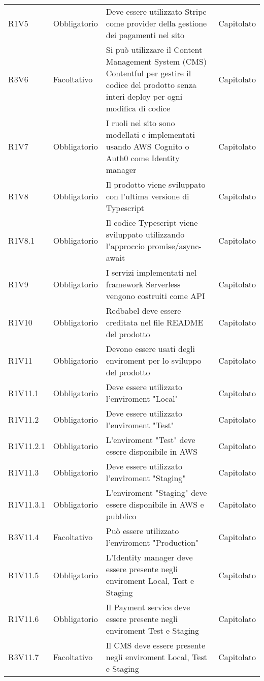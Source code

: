 {\begin{longtable}{C{2.5cm} C{2.8cm} C{6.7cm} C{2.5cm}}
R1V5 & Obbligatorio & Deve essere utilizzato Stripe come provider della gestione dei pagamenti nel sito & Capitolato \\

R3V6 & Facoltativo & Si può utilizzare il Content Management System (CMS) Contentful per gestire il codice del prodotto senza interi deploy per ogni modifica di codice & Capitolato \\

R1V7 & Obbligatorio & I ruoli nel sito sono modellati e implementati usando AWS Cognito o Auth0 come Identity manager & Capitolato \\

R1V8 & Obbligatorio & Il prodotto viene sviluppato con l'ultima versione di Typescript & Capitolato \\
R1V8.1 & Obbligatorio & Il codice Typescript viene sviluppato utilizzando l'approccio promise/async-await & Capitolato \\

R1V9 & Obbligatorio & I servizi implementati nel framework Serverless vengono costruiti come API & Capitolato \\

R1V10 & Obbligatorio & Redbabel deve essere creditata nel file README del prodotto & Capitolato \\

R1V11 & Obbligatorio & Devono essere usati degli enviroment per lo sviluppo del prodotto & Capitolato \\
R1V11.1 & Obbligatorio & Deve essere utilizzato l'enviroment "Local" & Capitolato \\
R1V11.2 & Obbligatorio & Deve essere utilizzato l'enviroment "Test" & Capitolato \\
R1V11.2.1 & Obbligatorio & L'enviroment "Test" deve essere disponibile in AWS & Capitolato \\
R1V11.3 & Obbligatorio & Deve essere utilizzato l'enviroment "Staging" & Capitolato \\
R1V11.3.1 & Obbligatorio & L'enviroment "Staging" deve essere disponibile in AWS e pubblico & Capitolato \\
R3V11.4 & Facoltativo & Può essere utilizzato l'enviroment "Production" & Capitolato \\

R1V11.5 & Obbligatorio & L'Identity manager deve essere presente negli enviroment Local, Test e Staging & Capitolato \\
R1V11.6 & Obbligatorio & Il Payment service deve essere presente negli enviroment Test e Staging & Capitolato \\
R3V11.7 & Facoltativo & Il CMS deve essere presente negli enviroment Local, Test e Staging & Capitolato \\

\end{longtable}

}